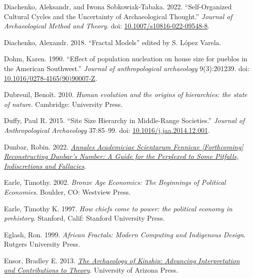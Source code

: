 \documentclass[
  12pt,
]{book}
\newlength{\cslhangindent}
\newlength{\cslentryspacingunit} %
\newenvironment{CSLReferences}[2] %
 {%
  \setlength{\parindent}{0pt}
  \ifodd #1
  \let\oldpar\par
  \def\par{\hangindent=\cslhangindent\oldpar}
  \fi
  \setlength{\parskip}{#2\cslentryspacingunit}
 }%
 {}
\begin{document}
\begin{CSLReferences}{1}{0}
\leavevmode{}%
Diachenko, Aleksandr, and Iwona Sobkowiak-Tabaka. 2022. {``Self-{Organized Cultural Cycles} and the {Uncertainty} of {Archaeological Thought}.''} \emph{Journal of Archaeological Method and Theory}. doi: \href{https://doi.org/10.1007/s10816-022-09548-8}{10.1007/s10816-022-09548-8}.

\leavevmode{}%
Diachenko, Alexandr. 2018. {``Fractal Models''} edited by S. López Varela.

\leavevmode{}%
Dohm, Karen. 1990. {``Effect of population nucleation on house size for pueblos in the American Southwest.''} \emph{Journal of anthropological archaeology} 9(3):201239. doi: \href{https://doi.org/10.1016/0278-4165(90)90007-Z}{10.1016/0278-4165(90)90007-Z}.

\leavevmode{}%
Dubreuil, Benoît. 2010. \emph{Human evolution and the origins of hierarchies: the state of nature}. Cambridge: University Press.

\leavevmode{}%
Duffy, Paul R. 2015. {``Site Size Hierarchy in Middle-Range Societies.''} \emph{Journal of Anthropological Archaeology} 37:85--99. doi: \href{https://doi.org/10.1016/j.jaa.2014.12.001}{10.1016/j.jaa.2014.12.001}.

\leavevmode{}%
Dunbar, Robin. 2022. \emph{\href{https://doi.org/10.13140/RG.2.2.34145.58727}{Annales Academiciae Scientarum Fennicae {[}Forthcoming{]} Reconstructing Dunbar's Number: A Guide for the Perplexed to Some Pitfalls, Indiscretions and Fallacies}}.

\leavevmode{}%
Earle, Timothy. 2002. \emph{Bronze Age Economics: The Beginnings of Political Economies}. Boulder, CO: Westview Press.

\leavevmode{}%
Earle, Timothy K. 1997. \emph{How chiefs come to power: the political economy in prehistory}. Stanford, Calif: Stanford University Press.

\leavevmode{}%
Eglash, Ron. 1999. \emph{African Fractals: Modern Computing and Indigenous Design}. Rutgers University Press.

\leavevmode{}%
Ensor, Bradley E. 2013. \emph{\href{https://www.jstor.org/stable/j.ctt183pcj3}{The Archaeology of Kinship: Advancing Interpretation and Contributions to Theory}}. University of Arizona Press.


\end{CSLReferences}
\end{document}
